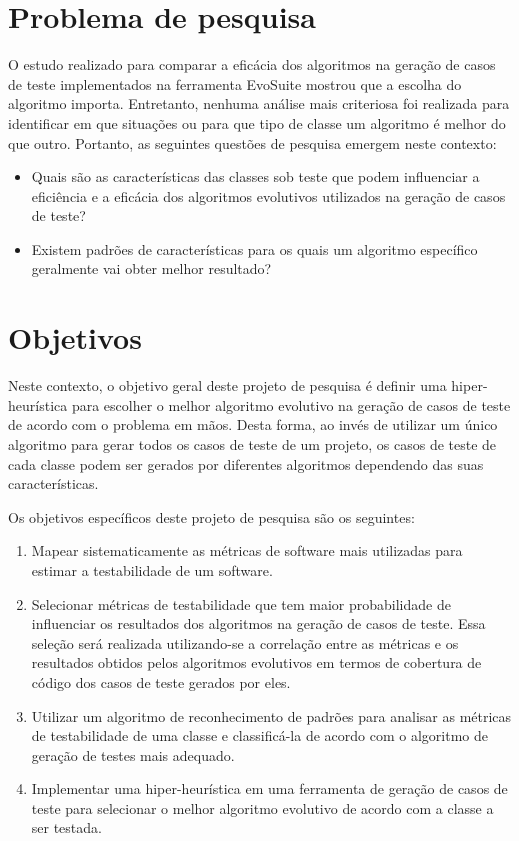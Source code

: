 \documentclass[
	12pt,				%
	oneside,			%
	a4paper,			%
	english,			%
	brazil				%
	]{abntex2ppgsi}
\begin{document}
\section{Problema de pesquisa}

O estudo realizado para comparar a eficácia dos algoritmos na geração de casos de teste implementados na ferramenta EvoSuite mostrou que a escolha do algoritmo importa. Entretanto, nenhuma análise mais criteriosa foi realizada para identificar em que situações ou para que tipo de classe um algoritmo é melhor do que outro. Portanto, as seguintes questões de pesquisa emergem neste contexto:

\begin{itemize}
  \item Quais são as características das classes sob teste que podem influenciar a eficiência e a eficácia dos algoritmos evolutivos utilizados na geração de casos de teste?
  \item Existem padrões de características para os quais um algoritmo específico geralmente vai obter melhor resultado?
\end{itemize}

\section{Objetivos}

Neste contexto, o objetivo geral deste projeto de pesquisa  é definir uma hiper-heurística para escolher o melhor algoritmo evolutivo na geração de casos de teste de acordo com o problema em mãos. Desta forma, ao invés de utilizar um único algoritmo para gerar todos os casos de teste de um projeto, os casos de teste de cada classe podem ser gerados por diferentes algoritmos dependendo das suas características.

Os objetivos específicos deste projeto de pesquisa são os seguintes:

\begin{enumerate}
	\item Mapear sistematicamente as métricas de software mais utilizadas para estimar a testabilidade de um software.
	\item Selecionar métricas de testabilidade que tem maior probabilidade de influenciar os resultados dos algoritmos na geração de casos de teste. Essa seleção será realizada utilizando-se a correlação entre as métricas e os resultados obtidos pelos algoritmos evolutivos em termos de cobertura de código dos casos de teste gerados por eles.
	\item Utilizar um algoritmo de reconhecimento de padrões para analisar as métricas de testabilidade de uma classe e classificá-la de acordo com o algoritmo de geração de testes mais adequado.
	\item Implementar uma hiper-heurística em uma ferramenta de geração de casos de teste para selecionar o melhor algoritmo evolutivo de acordo com a classe a ser testada.
\end{enumerate}
\end{document}
